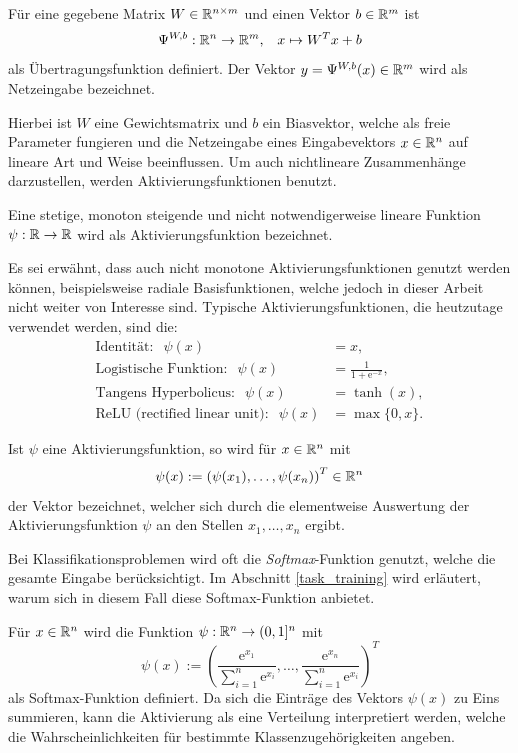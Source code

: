 \begin{defi}[Übertragungsfunktion]
    \label{def_net}
    Für eine gegebene Matrix $W \in \mathbb{R}^{n \times m}$ und einen Vektor $b \in \mathbb{R}^m$ ist 
    \[ 
    \Psi^{W,b}: \mathbb{R}^n \rightarrow \mathbb{R}^m, \; \; \; x \mapsto W^T x +b
    \]
    als Übertragungsfunktion definiert. Der Vektor $y=\Psi^{W,b}(x) \in \mathbb{R}^m $ wird als Netzeingabe bezeichnet.
\end{defi}
Hierbei ist $W$ eine Gewichtsmatrix und $b$ ein Biasvektor, welche als freie Parameter fungieren und die Netzeingabe eines Eingabevektors $x \in \mathbb{R}^n$ auf lineare Art und Weise beeinflussen. Um auch nichtlineare Zusammenhänge darzustellen, werden Aktivierungsfunktionen benutzt.

\begin{defi}[Aktivierungsfunktion]
    \label{def_act_f}
    Eine stetige, monoton steigende und nicht notwendigerweise lineare Funktion $\psi: \mathbb{R} \rightarrow \mathbb{R}$ wird als Aktivierungsfunktion bezeichnet.
\end{defi}
Es sei erwähnt, dass auch nicht monotone Aktivierungsfunktionen genutzt werden können, beispielsweise radiale Basisfunktionen\cite{radialbasis}, welche jedoch in dieser Arbeit nicht weiter von Interesse sind.
Typische Aktivierungsfunktionen, die heutzutage verwendet werden, sind die:
\begin{align*}
    \text{Identität}: \; \;\psi(x)&=x, \\
    \text{Logistische Funktion}: \; \;\psi(x)&=\frac{1}{1+\mathrm{e}^{-x}}, \\
    \text{Tangens Hyperbolicus}: \; \;\psi(x)&=\tanh(x), \\
    \text{ReLU (rectified linear unit)}: \; \;\psi(x)&=\max\{0,x\}.
\end{align*}

\begin{bem}
    Ist $\psi$ eine Aktivierungsfunktion, so wird für $x \in \mathbb{R}^n$ mit 
    \[\psi(x):=\left(\psi(x_1), \ldots, \psi(x_n)\right)^T \in \mathbb{R}^n
    \]
    der Vektor bezeichnet, welcher sich durch die elementweise Auswertung der Aktivierungsfunktion $\psi$ an den Stellen $x_1, \ldots, x_n$ ergibt. 
\end{bem}

Bei Klassifikationsproblemen wird oft die \textit{Softmax}-Funktion\cite{denker1990transforming} genutzt, welche die gesamte Eingabe berücksichtigt. Im Abschnitt \ref{task_training} wird erläutert, warum sich in diesem Fall diese Softmax-Funktion anbietet.

\begin{defi}[Softmax]
    Für $x \in \mathbb{R}^n$ wird die Funktion $\psi: \mathbb{R}^n \rightarrow (0,1]^n$ mit 
    \[
        \psi(x):=\left(\frac{\mathrm{e}^{x_1}}{\sum_{i=1}^n \mathrm{e}^{x_i}}, \ldots,\frac{\mathrm{e}^{x_n}}{\sum_{i=1}^n \mathrm{e}^{x_i}} \right)^T
    \]
    als Softmax-Funktion definiert. Da sich die Einträge des Vektors $\psi(x)$ zu Eins summieren, kann die Aktivierung als eine Verteilung interpretiert werden, welche die Wahrscheinlichkeiten für bestimmte Klassenzugehörigkeiten angeben.  
\end{defi}

